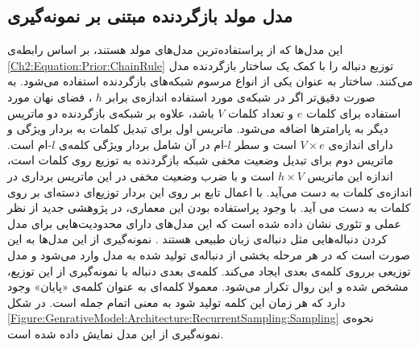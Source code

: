  \subsection{مدل‌ مولد بازگردنده مبتنی بر نمونه‌گیری}
 \label{Model:RecurrentSampling}
این مدل‌ها که از پراستفاده‌ترین مدل‌های مولد هستند، بر اساس رابطه‌ی
 \ref{Ch2:Equation:Prior:ChainRule}
 توزیع دنباله را با کمک یک ساختار بازگردنده مدل می‌کنند. ساختار
  \cite{hochreiter1997LSTM}
  به عنوان یکی از انواع مرسوم شبکه‌های بازگردنده استفاده می‌شود.
 به صورت دقیق‌تر اگر در شبکه‌ی مورد استفاده اندازه‌ی
 برابر $h$ ، فضای نهان مورد استفاده برای کلمات $e$ و تعداد کلمات  $V$ باشد، علاوه بر شبکه‌ی بازگردنده دو ماتریس دیگر به پارامتر‌ها اضافه می‌شود. 
 ماتریس اول برای تبدیل کلمات به بردار ویژگی و دارای اندازه‌ی
$V\times e$
  است و سطر $l$-ام در آن شامل بردار ویژگی کلمه‌ی $l$-ام است.
 ماتریس دوم برای تبدیل وضعیت مخفی شبکه بازگردنده به توزیع روی کلمات است، اندازه این ماتریس
  $h\times V$
   است و با ضرب وضعیت مخفی در این ماتریس  برداری در اندازه‌ی کلمات به دست می‌آید. با اعمال تابع 
 بر روی این بردار توزیع‌ای دسته‌ای 
 بر روی کلمات به دست می آید.
 \newline
 با وجود پراستفاده بودن این معماری، در پژوهشی جدید از نظر عملی  و تئوری نشان داده ‌شده است که این مدل‌های دارای محدودیت‌هایی  برای مدل کردن دنباله‌هایی مثل دنباله‌ی زبان طبیعی هستند
 \cite{yang2018breaking}.
 \newline
 نمونه‌گیری از این مدل‌ها به این صورت است که در هر مرحله بخشی از دنباله‌ی تولید شده به مدل وارد می‌شود و مدل توزیعی برروی کلمه‌ی بعدی ایجاد می‌کند. کلمه‌ی بعدی دنباله با نمونه‌گیری از این توزیع، مشخص شده و این روال تکرار می‌شود. معمولا کلمه‌ای به عنوان کلمه‌ی «پایان» وجود دارد که هر زمان این کلمه تولید شود به معنی اتمام جمله است. در شکل
 \ref{Figure:GenrativeModel:Architecture:RecurrentSampling:Sampling}
 نحوه‌ی نمونه‌گیری از این مدل نمایش داده شده است.
